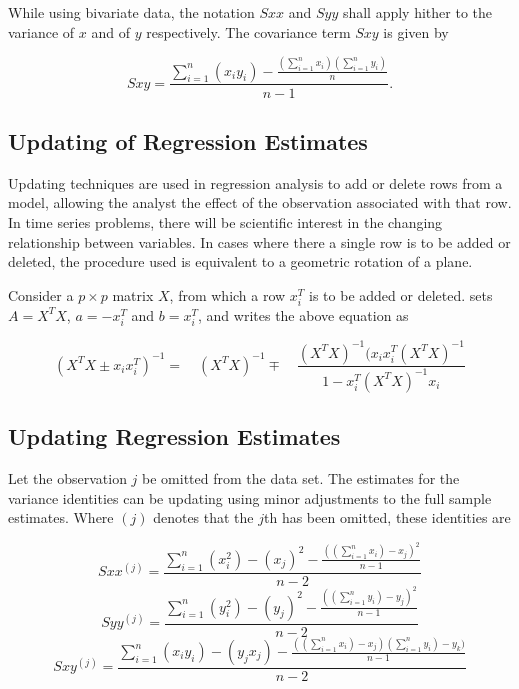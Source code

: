 \documentclass[12pt, a4paper]{report}
\theoremstyle{plain}
\theoremstyle{definition}
\theoremstyle{remark}
\begin{document}
While using bivariate data, the notation $Sxx$ and $Syy$ shall apply hither to the variance of $x$ and of $y$ respectively. The covariance term $Sxy$ is given by


\begin{equation}
Sxy=\frac{\sum_{i=1}^{n}(x_{i}y_{i})-\frac{(\sum_{i=1}^{n}x_{i})(\sum_{i=1}^{n}y_{i})}{n}}{n-1}.
\end{equation}


\subsection{Updating of Regression Estimates}
Updating techniques are used in regression analysis to add or
delete rows from a model, allowing the analyst the effect of the
observation associated with that row. In time series problems,
there will be scientific interest in the changing relationship
between variables. In cases where there a single row is to be
added or deleted, the procedure used is equivalent to a geometric
rotation of a plane.


Consider a $p \times p$ matrix $X$, from which a row $x_{i}^{T}$
is to be added or deleted. \citet{CookWeisberg} sets $A = X^{T}X$,
$a=-x_{i}^{T}$ and $b=x_{i}^{T}$, and writes the above equation as


\begin{equation}
(X^{T}X \pm x_{i}x_{i}^{T})^{-1} = \quad(X^{T}X )^{-1} \mp \quad
\frac{(X^{T}X)^{-1}(x_{i}x_{i}^{T}(X^{T}X)^{-1}}{1-x_{i}^{T}(X^{T}X)^{-1}x_{i}}
\end{equation}


\subsection{Updating Regression Estimates}
Let the observation $j$ be omitted from the data set. The estimates for the variance identities can be updating using minor adjustments to the full sample estimates. Where $(j)$ denotes that the $j$th has been omitted, these identities are


\begin{equation}
Sxx^{(j)}=\frac{\sum_{i=1}^{n}(x_{i}^{2})-(x_{j})^{2}-\frac{((\sum_{i=1}^{n}x_{i})-x_{j})^{2}}{n-1}}{n-2}
\end{equation}
\begin{equation}
Syy^{(j)}=\frac{\sum_{i=1}^{n}(y_{i}^{2})-(y_{j})^{2}-\frac{((\sum_{i=1}^{n}y_{i})-y_{j})^{2}}{n-1}}{n-2}
\end{equation}
\begin{equation}
Sxy^{(j)}=\frac{\sum_{i=1}^{n}(x_{i}y_{i})-(y_{j}x_{j})-\frac{((\sum_{i=1}^{n}x_{i})-x_{j})(\sum_{i=1}^{n}y_{i})-y_{k})}{n-1}}{n-2}
\end{equation}
\end{document}
